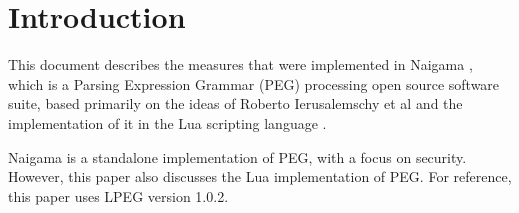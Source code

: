 \section{Introduction}

This document describes the measures that were implemented in Naigama
\cite{bib:naigama}, which is a Parsing Expression Grammar (PEG) processing
open source software suite,
based primarily on the ideas of Roberto Ierusalemschy et al
\cite{bib:peg} and the implementation of it in the Lua
scripting language \cite{bib:lua} \cite{bib:lpeg}.

Naigama is a standalone implementation of PEG, with a focus on security.
However, this paper also discusses
the Lua implementation of PEG. For reference, this paper uses
LPEG version 1.0.2.
